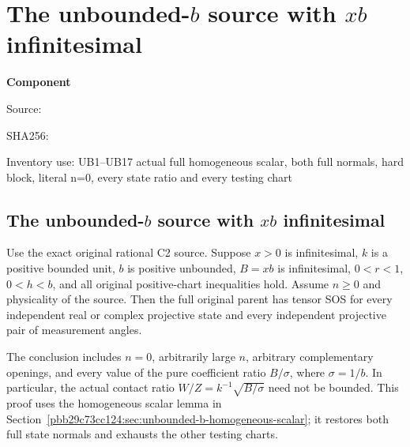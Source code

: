\chapter{The unbounded-$b$ source with $xb$ infinitesimal}
\label{component:pab6222b899ef}
\noindent\textbf{Component }\par
{\small\noindent Source: \par}
{\small\noindent SHA256: \par}
{\small\noindent Inventory use: UB1--UB17 actual full homogeneous scalar, both full normals, hard block, literal n=0, every state ratio and every testing chart\par}
\medskip
\section[The unbounded-b source with xb infinitesimal]{The unbounded-$b$ source with $xb$ infinitesimal}
\label{pab6222b899ef:sec:c2-unbounded-b-small-B}

\begin{theorem}
Use the exact original rational C2 source.  Suppose $x>0$ is
infinitesimal, $k$ is a positive bounded unit, $b$ is positive
unbounded, $B=xb$ is infinitesimal, $0<r<1$, $0<h<b$, and all
original positive-chart inequalities hold.  Assume $n\geq0$ and
physicality of the source.  Then the full original parent has tensor
SOS for every independent real or complex projective state and
every independent projective pair of measurement angles.
\end{theorem}

The conclusion includes $n=0$, arbitrarily large $n$, arbitrary
complementary openings, and every value of the pure coefficient
ratio $B/\sigma$, where $\sigma=1/b$.  In particular, the actual
contact ratio $W/Z=k^{-1}\sqrt{B/\sigma}$ need not be bounded.
This proof uses the homogeneous scalar lemma in
Section~\ref{pbb29c73cc124:sec:unbounded-b-homogeneous-scalar}; it restores both
full state normals and exhausts the other testing charts.

